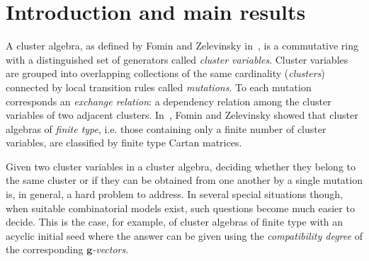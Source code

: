 \documentclass[pdftex]{sigma}
\numberwithin{equation}{section}
\numberwithin{theorem}{section}
\numberwithin{proposition}{section}
\numberwithin{lemma}{section}
\numberwithin{corollary}{section}
\numberwithin{definition}{section}
\numberwithin{example}{section}
\numberwithin{remark}{section}
\numberwithin{note}{section}
\newcommand{\bg}{\mathbf{g}}
\begin{document}
\renewcommand{\PaperNumber}{***}

\FirstPageHeading











\section{Introduction and main results}
  A cluster algebra, as defined by Fomin and Zelevinsky in~\cite{FZ02}, is a commutative ring with a distinguished set of generators called \emph{cluster variables}.
  Cluster variables are grouped into overlapping collections of the same cardinality (\emph{clusters}) connected by local transition rules called \emph{mutations}.
  To each mutation corresponds an \emph{exchange relation}: a dependency relation among the cluster variables of two adjacent clusters.
  In~\cite{FZ03}, Fomin and Zelevinsky showed that cluster algebras of \emph{finite type}, i.e. those containing only a finite number of cluster variables, are classified by finite type Cartan matrices.

  Given two cluster variables in a cluster algebra, deciding whether they belong to the same cluster or if they can be obtained from one another by a single mutation is, in general, a hard problem to address.
  In several special situations though, when suitable combinatorial models exist, such questions become much easier to decide.
  This is the case, for example, of cluster algebras of finite type with an acyclic initial seed where the answer can be given using the \emph{compatibility degree} of the corresponding \emph{$\bg$-vectors}.
\end{document}
